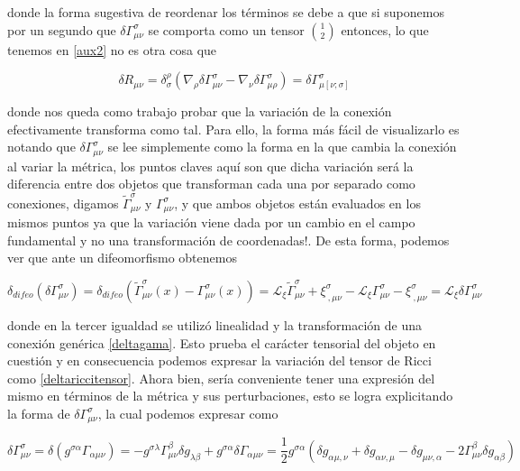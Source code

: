 \documentclass{article}
\numberwithin{equation}{section}
\begin{document}
donde la forma sugestiva de reordenar los términos se debe a que si suponemos por un segundo que $ \delta \Gamma^{\sigma}_{\mu \nu}  $ se comporta como un tensor $ \binom{1}{2} $ entonces, lo que tenemos en \ref{aux2} no es otra cosa que
 
\begin{equation}\label{deltariccitensor}
\delta R_{\mu\nu}= \delta^{\rho}_{\sigma} \left( \nabla_{\rho} \delta \Gamma^{\sigma}_{\mu \nu} - \nabla_{\nu} \delta \Gamma^{\sigma}_{\mu \rho}\right) = \delta\Gamma^{\sigma}_{\mu \left[\nu ; \sigma \right]}
\end{equation}
 
donde nos queda como trabajo probar que la variación de la conexión efectivamente transforma como tal. Para ello, la forma más fácil de visualizarlo es notando que  $ \delta \Gamma^{\sigma}_{\mu \nu}  $ se lee simplemente como la forma en la que cambia la conexión al variar la métrica, los puntos claves aquí son que dicha variación será la diferencia entre dos objetos que transforman cada una por separado como conexiones, digamos $\tilde{\Gamma}^{\sigma}_{\mu \nu} $ y  $ \Gamma^{\sigma}_{\mu \nu}  $, y que ambos objetos están evaluados en los mismos puntos ya que la variación viene dada por un cambio en el campo fundamental y no una transformación de coordenadas!. De esta forma, podemos ver que ante un difeomorfismo obtenemos

\begin{equation*}
\delta_{difeo} \left( \delta\Gamma^{\sigma}_{\mu \nu} \right) = \delta_{difeo} \left( \tilde{\Gamma}^{\sigma}_{\mu \nu}(x) - {\Gamma}^{\sigma}_{\mu \nu} (x)\right)  = \mathcal{L}_{\xi} \tilde{\Gamma}^{\sigma}_{\mu \nu}  + \xi^{\sigma}_{ \ , \mu \nu} - \mathcal{L}_{\xi} \Gamma^{\sigma}_{\mu \nu}  - \xi^{\sigma}_{ \ , \mu \nu} = \mathcal{L}_{\xi}\delta\Gamma^{\sigma}_{\mu \nu}
\end{equation*}

donde en la tercer igualdad se utilizó linealidad y la transformación de una conexión genérica \ref{deltagama}. Esto prueba el carácter tensorial del objeto en cuestión y en consecuencia podemos expresar la variación del tensor de Ricci como \ref{deltariccitensor}. Ahora bien, sería conveniente tener una expresión del mismo en términos de la métrica y sus perturbaciones, esto se logra explicitando la forma de $ \delta \Gamma^{\sigma}_{\mu \nu}  $, la cual podemos expresar como

\begin{equation*}
\delta \Gamma^{\sigma}_{\mu \nu} = \delta \left( g^{\sigma \alpha}  \Gamma_{\alpha \mu \nu} \right) = - g^{\sigma \lambda} \Gamma^{\beta}_{\mu\nu} \delta g_{\lambda \beta} + g^{\sigma\alpha}\delta\Gamma_{\alpha \mu \nu} = \frac{1}{2} g^{\sigma\alpha}\left( \delta g_{\alpha \mu , \nu} + \delta g_{\alpha \nu , \mu} - \delta g_{\mu \nu , \alpha} - 2\Gamma^{\beta}_{\mu \nu} \delta g_{\alpha \beta}\right)
\end{equation*}
\end{document}
